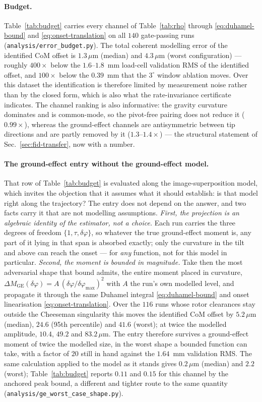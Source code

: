 \paragraph{Budget.} Table~\ref{tab:budget} carries every channel of
Table~\ref{tab:rho} through \eqref{eq:duhamel-bound} and
\eqref{eq:onset-translation} on all $140$ gate-passing runs
(\texttt{analysis/error\_budget.py}). The total coherent modelling
error of the identified CoM offset is $1.3\,\mu$m (median) and
$4.3\,\mu$m (worst configuration) --- roughly $400\times$ below the
$1.6$--$1.8$~mm load-cell validation RMS of the identified offset, and
$100\times$ below the $0.39$~mm that the $3^\circ$ window ablation
moves. Over this dataset the identification is therefore limited by
measurement noise rather than by the closed form, which is also what
the rate-invariance certificate indicates. The channel ranking is
also informative: the gravity curvature dominates and is common-mode,
so the pivot-free pairing does not reduce it ($0.99\times$), whereas the
ground-effect channels are antisymmetric between tip directions and are
partly removed by it ($1.3$--$1.4\times$) --- the structural statement of
Sec.~\ref{sec:fid-transfer}, now with a number.

\paragraph{The ground-effect entry without the ground-effect model.}
That row of Table~\ref{tab:budget} is evaluated along the
image-superposition model, which invites the objection that it assumes
what it should establish: is that model right along the trajectory?
The entry does not depend on the answer, and two facts carry it that
are not modelling assumptions. \emph{First, the projection is an
algebraic identity of the estimator, not a choice.} Each run carries
the three degrees of freedom $\{1, \tau, \delta\varphi\}$, so whatever
the true ground-effect moment is, any part of it lying in that span is
absorbed exactly; only the curvature in the tilt and above can reach
the onset --- for \emph{any} function, not for this model in
particular. \emph{Second, the moment is bounded in magnitude.} Take
then the most adversarial shape that bound admits, the entire moment
placed in curvature,
$\Delta M_{\mathrm{GE}}(\delta\varphi) = A\,(\delta\varphi /
\delta\varphi_{\max})^2$ with $A$ the run's own modelled level, and
propagate it through the same Duhamel integral
\eqref{eq:duhamel-bound} and onset linearisation
\eqref{eq:onset-translation}. Over the $116$ runs whose rotor
clearances stay outside the Cheeseman singularity this moves the
identified CoM offset by $5.2\,\mu$m (median), $24.6$ (95th
percentile) and $41.6$ (worst); at twice the modelled amplitude,
$10.4$, $49.2$ and $83.2\,\mu$m. The entry therefore survives a
ground-effect moment of twice the modelled size, in the worst shape a
bounded function can take, with a factor of $20$ still in hand against
the $1.64$~mm validation RMS. The same calculation applied to the
model as it stands gives $0.2\,\mu$m (median) and $2.2$ (worst);
Table~\ref{tab:budget} reports $0.11$ and $0.15$ for this channel by
the anchored peak bound, a different and tighter route to the same
quantity (\texttt{analysis/ge\_worst\_case\_shape.py}).

